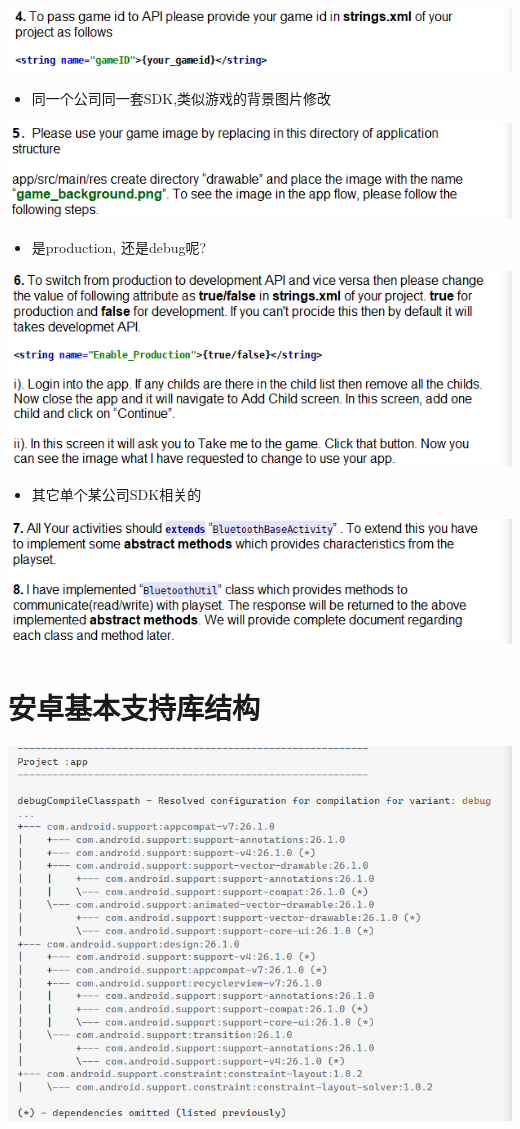 \documentclass[9pt, b5paper]{article}
\begin{document}
\includegraphics[width=.9\linewidth]{./pic/notes_20221220_153240.png}
\begin{itemize}
\item 同一个公司同一套SDK,类似游戏的背景图片修改
\end{itemize}

\includegraphics[width=.9\linewidth]{./pic/notes_20221220_153320.png}
\begin{itemize}
\item 是production, 还是debug呢?
\end{itemize}

\includegraphics[width=.9\linewidth]{./pic/notes_20221220_153405.png}
\begin{itemize}
\item 其它单个某公司SDK相关的
\end{itemize}

\includegraphics[width=.9\linewidth]{./pic/notes_20221220_153542.png}
\section{安卓基本支持库结构}
\label{sec-7}

\includegraphics[width=.9\linewidth]{./pic/notes_20221220_223427.png}
\end{document}
